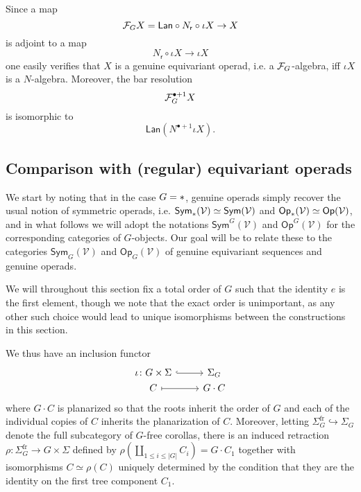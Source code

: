 \documentclass[a4paper,10pt]{article}%
\begin{document}
\begin{remark}\label{REPACKAGERES REM}
Since a map 
\[\mathcal F_G X =\mathsf{Lan} \circ N_{\mathsf{r}} \circ \iota X \to X\]
is adjoint to a map
\[N_{\mathsf{r}} \circ \iota X \to \iota X\]
one easily verifies that 
$X$ is a genuine equivariant operad, i.e. 
a $\mathcal F_G$-algebra, iff 
$\iota X$ is a $N$-algebra.
Moreover, the bar resolution
\[
	\mathcal F_G^{\bullet +1} X 
\]
is isomorphic to
\[
	\mathsf{Lan} \left( N^{\bullet +1} \iota X \right).
\]
\end{remark}


\subsection{Comparison with (regular) equivariant operads}

We start by noting that in the case $G = \**$, genuine operads simply recover the usual notion of symmetric operads, i.e. 
$\mathsf{Sym}_{\**}(\mathcal{V})
\simeq \mathsf{Sym}(\mathcal{V})$
and
$\mathsf{Op}_{\**}(\mathcal{V})
\simeq \mathsf{Op}(\mathcal{V})$, 
and in what follows we will adopt the notations
$\mathsf{Sym}^G(\mathcal{V})$ and
$\mathsf{Op}^G(\mathcal{V})$ 
for the corresponding categories of $G$-objects.
Our goal will be to relate these to the categories
$\mathsf{Sym}_G(\mathcal{V})$ and $\mathsf{Op}_G(\mathcal{V})$
of genuine equivariant sequences and genuine operads.

We will throughout this section fix a total order of $G$ such that the identity $e$ is the first element, though we note that the exact order is unimportant, as any other such choice would lead to unique isomorphisms between the constructions in this section.


We thus have an inclusion functor
\[
\begin{tikzcd}[row sep =0]
	\iota \colon G \times \Sigma \ar[hookrightarrow]{r} &
	\Sigma_G
\\
	C \ar[mapsto]{r} & G \cdot C
\end{tikzcd}
\]
where $G \cdot C$ is planarized so that the roots inherit the order of $G$ and each of the individual copies of $C$ inherits the planarization of $C$.
Moreover, letting $\Sigma_G^{\text{fr}} \hookrightarrow \Sigma_G$ denote the full subcategory of $G$-free corollas, there is an induced retraction 
$\rho \colon \Sigma_{G}^{\text{fr}} \to G \times \Sigma$
defined by 
$\rho(\amalg_{1\leq i \leq |G|} C_i) = G \cdot C_1$
together with isomorphisms 
$C \simeq \rho(C)$
uniquely determined by the condition that they
are the identity on the first tree component $C_1$.
\end{document}
